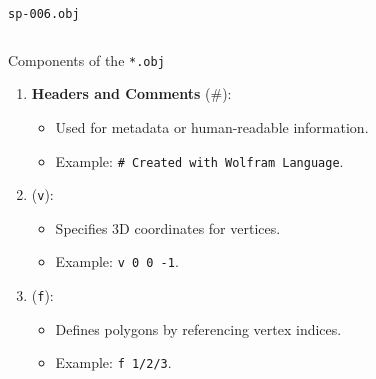 %    


\begin{frame}[fragile]{\texttt{sp-006.obj}}
    \begin{columns}[T] %
        \lstset{style=obj} %
        
        \lstset{style=obj} %
    \end{columns}
\end{frame}


\begin{frame}{Components of the \texttt{*.obj}}
    \begin{enumerate}
        \item \textbf{Headers and Comments} (\#):
            \begin{itemize}
                \item Used for metadata or human-readable information.
                \item Example: \texttt{\# Created with Wolfram Language}.
            \end{itemize}

        \item {} (\texttt{v}):
            \begin{itemize}
                \item Specifies 3D coordinates for vertices.
                \item Example: \texttt{v 0 0 -1}.
            \end{itemize}

        \item {} (\texttt{f}):
            \begin{itemize}
                \item Defines polygons by referencing vertex indices.
                \item Example: \texttt{f 1/2/3}.
            \end{itemize}
    \end{enumerate}
        \setcounter{listnumber}{\value{enumi}}
\end{frame}

